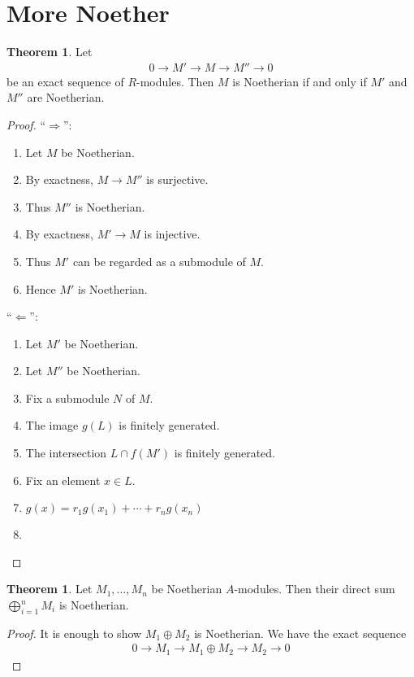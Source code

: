 \documentclass[a4paper]{book}
\theoremstyle{definition}
\newtheorem{theorem}[definition]{Theorem}
\begin{document}
\section{More Noether}
\begin{thmbox}
    \begin{theorem}
        Let
        \begin{align*}
            0 \longrightarrow M' \longrightarrow M \longrightarrow M'' \longrightarrow 0
        \end{align*}
        be an exact sequence of \(R\)-modules. Then \(M\) is Noetherian if and only if \(M'\) and \(M''\) are Noetherian.
    \end{theorem}
\end{thmbox}
\begin{proof}
    ``\(\Rightarrow\)'':
    \begin{enumerate}
        \item Let \(M\) be Noetherian.
        \item By exactness, \(M \rightarrow M''\) is surjective.
        \item Thus \(M''\) is Noetherian.
        \item By exactness, \(M' \rightarrow M\) is injective.
        \item Thus \(M'\) can be regarded as a submodule of \(M\).
        \item Hence \(M'\) is Noetherian.
    \end{enumerate}
    ``\(\Leftarrow\)'':
    \begin{enumerate}
        \item Let \(M'\) be Noetherian.
        \item Let \(M''\) be Noetherian.
        \item Fix a submodule \(N\) of \(M\).
        \item The image \(g(L)\) is finitely generated.
        \item The intersection \(L \cap f(M')\) is finitely generated.
        \item Fix an element \(x \in L\).
        \item \(g(x) = r_1 g(x_1) + \cdots + r_n g(x_n)\)
        \item 
    \end{enumerate}
\end{proof}

\begin{thmbox}
    \begin{theorem}
        Let \(M_1, \ldots, M_n\) be Noetherian \(A\)-modules. Then their direct sum \(\bigoplus_{i=1}^n M_i\) is Noetherian.
    \end{theorem}
\end{thmbox}
\begin{proof}
    It is enough to show \(M_1 \oplus M_2\) is Noetherian. We have the exact sequence
    \begin{align}
        0 \longrightarrow M_1 \longrightarrow M_1 \oplus M_2 \longrightarrow M_2 \longrightarrow 0
    \end{align}
\end{proof}
\end{document}
